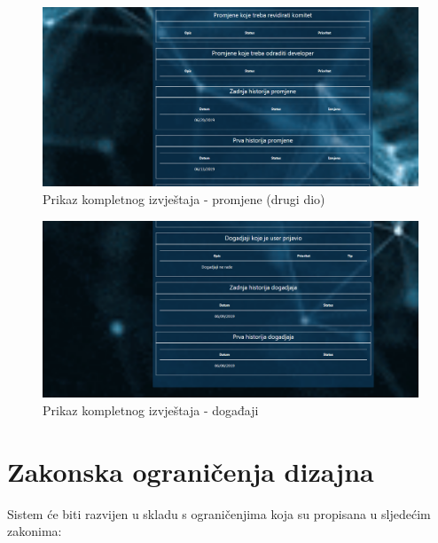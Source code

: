 \documentclass[12pt,a4paper]{article}
\begin{document}
\begin{figure}[H]
\center
\includegraphics[scale=0.35]{../res/UI/report3.PNG}
\caption{Prikaz kompletnog izvještaja - promjene (drugi dio)}
\label{s17}
\end{figure}

\begin{figure}[H]
\center
\includegraphics[scale=0.35]{../res/UI/report4.PNG}
\caption{Prikaz kompletnog izvještaja - događaji}
\label{s18}
\end{figure}

\newpage

\section{Zakonska ograničenja dizajna}

Sistem će biti razvijen u skladu s ograničenjima koja su propisana u sljedećim zakonima:
\end{document}
